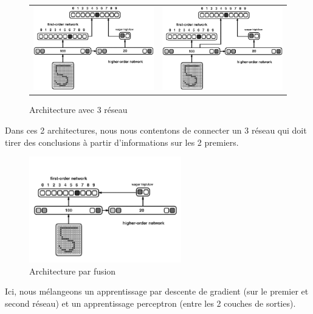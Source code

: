 \documentclass[a4paper,12pt, twoside]{article}
\begin{document}
\begin{figure}[H]
 \begin{center}
\begin{tabular}{c|c}
 \includegraphics[width=210px]{../pre-presentation/thrid.png} & 
 \includegraphics[width=210px]{../pre-presentation/thrid_hidden.png}
\end{tabular}
\end{center}
\caption{Architecture avec 3 réseau}
\end{figure}

Dans ces 2 architectures, nous nous contentons de connecter un 3 réseau qui doit 
tirer des conclusions à partir d'informations sur les 2 premiers.

\begin{figure}[H]
 \begin{center}
 \includegraphics[width=250px]{../pre-presentation/merging.png}
\end{center}
\caption{Architecture par fusion}
\end{figure}

Ici, nous mélangeons un apprentissage par descente de gradient (sur le premier et second réseau)
et un apprentissage perceptron (entre les 2 couches de sorties).
\end{document}
